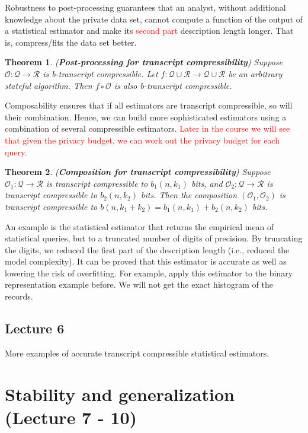 \documentclass[]{article}
\newtheorem{theorem}{Theorem}[section]
\begin{document}
Robustness to post-processing guarantees that an analyst, without additional knowledge about the private data set, cannot compute a function of the output of a statistical estimator and make its \textcolor{red}{second part} description length longer. That is, compress/fits the data set better. 
\begin{theorem} (\textbf{Post-processing for transcript compressibility})
	Suppose $\mathcal{O}: \mathcal{Q} \rightarrow \mathcal{R}$ is b-transcript compressible. Let $f:\mathcal{Q} \cup \mathcal{R} \rightarrow \mathcal{Q} \cup \mathcal{R}$ be an arbitrary stateful algorithm. Then $f \circ \mathcal{O}$ is also b-transcript compressible. 
\end{theorem}

Composability ensures that if all estimators are transcript compressible, so will their combination. Hence, we can build more sophisticated estimators using a combination of several compressible estimators. \textcolor{red}{Later in the course we will see that given the privacy budget, we can work out the privacy budget for each query.}

\begin{theorem} (\textbf{Composition for transcript compressibility})
	Suppose $\mathcal{O}_1: \mathcal{Q} \rightarrow \mathcal{R}$ is transcript compressible to $b_1(n,k_1)$ bits, and $\mathcal{O}_2: \mathcal{Q} \rightarrow \mathcal{R}$ is transcript compressible to $b_2(n,k_2)$ bits. Then the composition $(\mathcal{O}_1,\mathcal{O}_2)$ is transcript compressible to $b(n,k_1+k_2) = b_1(n,k_1)+b_2(n,k_2)$ bits. 
\end{theorem}

An example is the statistical estimator that returns the empirical mean of statistical queries, but to a truncated number of digits of precision. By truncating the digits, we reduced the first part of the description length (i.e., reduced the model complexity). It can be proved that this estimator is accurate as well as lowering the risk of overfitting. For example, apply this estimator to the binary representation example before. We will not get the exact histogram of the records.  

\subsection{Lecture 6}
More examples of accurate transcript compressible statistical estimators. 


\section{Stability and generalization (Lecture 7 - 10)}
\end{document}
